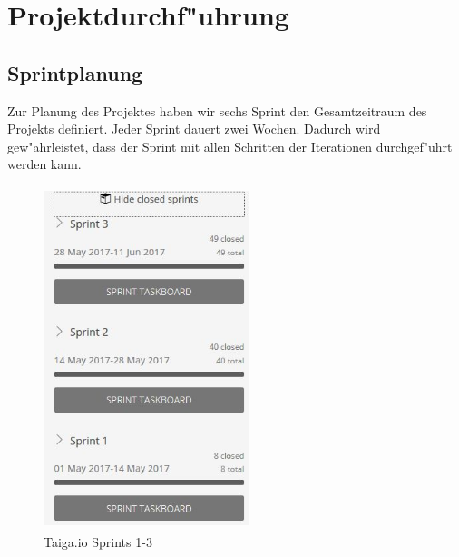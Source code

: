 \documentclass[a4paper, 11pt]{scrreprt}
\begin{document}
\section{Projektdurchf"uhrung}

\subsection{Sprintplanung}

Zur Planung des Projektes haben wir sechs Sprint den Gesamtzeitraum des Projekts definiert. Jeder Sprint dauert zwei Wochen. Dadurch wird gew"ahrleistet, dass der Sprint mit allen Schritten der Iterationen durchgef"uhrt werden kann.

\begin{figure} [H]
\begin{center}

\includegraphics[width=6cm, height=10cm]{sprint_2.jpg}
\caption{Taiga.io Sprints 1-3}

\end{center}
\end{figure}
\end{document}
